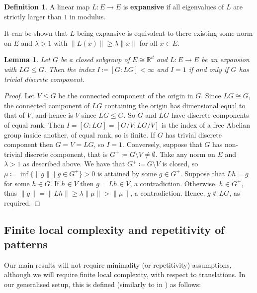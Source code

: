 \documentclass[11pt]{amsart}
\numberwithin{equation}{section}
\theoremstyle{plain}
\newtheorem{lemma}[theorem]{Lemma}
\theoremstyle{definition}
\newtheorem{definition}[theorem]{Definition}
\newcommand{\R}{\mathbb R}
\begin{document}
\begin{definition}\label{def:expansive}
A linear map \(L \colon E \to E\) is \textbf{expansive} if all eigenvalues of \(L\) are strictly larger than \(1\) in modulus.
\end{definition}

It can be shown that \(L\) being expansive is equivalent to there existing some norm on \(E\) and \(\lambda > 1\) with \(\|L(x)\| \geq \lambda \|x\|\) for all \(x \in E\).

\begin{lemma}\label{lem:index of closed subgroups}
Let \(G\) be a closed subgroup of \(E \cong \R^d\) and \(L \colon E \to E\) be an expansion with \(LG \leqslant G\). Then the index \(I \coloneqq [G : LG] < \infty\) and \(I = 1\) if and only if \(G\) has trivial discrete component.
\end{lemma}

\begin{proof}
Let \(V \leqslant G\) be the connected component of the origin in \(G\). Since \(LG \cong G\), the connected component of \(LG\) containing the origin has dimensional equal to that of \(V\), and hence is \(V\) since \(LG \leqslant G\). So \(G\) and \(LG\) have discrete components of equal rank. Then \(I = [G : LG] = [G/V : LG/V]\) is the index of a free Abelian group inside another, of equal rank, so is finite. If \(G\) has trivial discrete component then \(G = V = LG\), so \(I = 1\). Conversely, suppose that \(G\) has non-trivial discrete component, that is \(G^+ \coloneqq G \setminus V \neq \emptyset\). Take any norm on \(E\) and \(\lambda > 1\) as described above. We have that \(G^+ \coloneqq G \setminus V\) is closed, so \(\mu \coloneqq \inf\{\|g\| \mid g \in G^+\} > 0\) is attained by some \(g \in G^+\). Suppose that \(Lh = g\) for some \(h \in G\). If \(h \in V\) then \(g = Lh \in V\), a contradiction. Otherwise, \(h \in G^+\), thus \(\|g\| = \|Lh\| \geq \lambda\|\mu\| > \|\mu\|\), a contradiction. Hence, \(g \notin LG\), as required.
\end{proof}

\subsection{Finite local complexity and repetitivity of patterns}

Our main results will not require minimality (or repetitivity) assumptions, although we will require finite local complexity, with respect to translations. In our generalised setup, this is defined (similarly to in \cite{BG13}) as follows:
\end{document}
